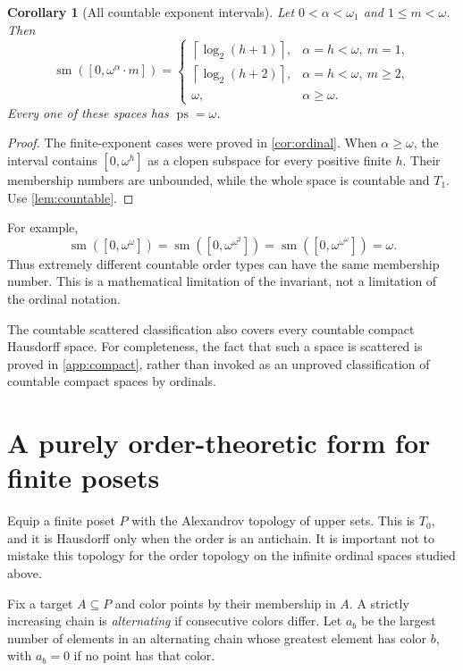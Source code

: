 \documentclass[11pt,letterpaper]{article}
\numberwithin{equation}{section}
\newtheorem{corollary}[corollary]{Corollary}
\theoremstyle{definition}
\theoremstyle{remark}
\newcommand{\sm}{\operatorname{sm}}
\newcommand{\ps}{\operatorname{ps}}
\newcommand{\ceil}[1]{\left\lceil#1\right\rceil}
\begin{document}
\begin{corollary}[All countable exponent intervals]\label{cor:allordinals}
Let $0<\alpha<\omega_1$ and $1\leq m<\omega$. Then
\[
 \sm([0,\omega^\alpha\cdot m])=
 \begin{cases}
 \ceil{\log_2(h+1)},&\alpha=h<\omega,\ m=1,\\
 \ceil{\log_2(h+2)},&\alpha=h<\omega,\ m\geq2,\\
 \omega,&\alpha\geq\omega.
 \end{cases}
\]
Every one of these spaces has $\ps=\omega$.
\end{corollary}
\begin{proof}
The finite-exponent cases were proved in \cref{cor:ordinal}. When
$\alpha\geq\omega$, the interval contains $[0,\omega^h]$ as a clopen subspace
for every positive finite $h$. Their membership numbers are unbounded, while
the whole space is countable and $T_1$. Use \cref{lem:countable}.
\end{proof}

For example,
\[
 \sm([0,\omega^\omega])
 =\sm([0,\omega^{\omega^2}])
 =\sm([0,\omega^{\omega^\omega}])=\omega.
\]
Thus extremely different countable order types can have the same membership
number. This is a mathematical limitation of the invariant, not a limitation
of the ordinal notation.

The countable scattered classification also covers every countable compact
Hausdorff space. For completeness, the fact that such a space is scattered is
proved in \cref{app:compact}, rather than invoked as an unproved classification
of countable compact spaces by ordinals.

\section{A purely order-theoretic form for finite posets}\label{sec:posets}

Equip a finite poset $P$ with the Alexandrov topology of upper sets. This is
$T_0$, and it is Hausdorff only when the order is an antichain. It is important
not to mistake this topology for the order topology on the infinite ordinal
spaces studied above.

Fix a target $A\subseteq P$ and color points by their membership in $A$.
A strictly increasing chain is \emph{alternating} if consecutive colors differ.
Let $a_b$ be the largest number of elements in an alternating chain whose
greatest element has color $b$, with $a_b=0$ if no point has that color.
\end{document}
